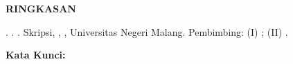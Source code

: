 %
%

\clearpage
{}

\begin{center}
    \bfseries RINGKASAN
\end{center}

\begin{singlespace}

\noindent \penulis. \bulantahun. \textit{\judul}. Skripsi, \jurusan, \fakultas, Universitas Negeri Malang. Pembimbing: (I) \pembimbingSatu; (II) \pembimbingDua.

\vspace{0.5\baselineskip}
\noindent \textbf{Kata Kunci:} \katakunci

\vspace{\baselineskip}
\blindtext

\end{singlespace}
\clearpage
